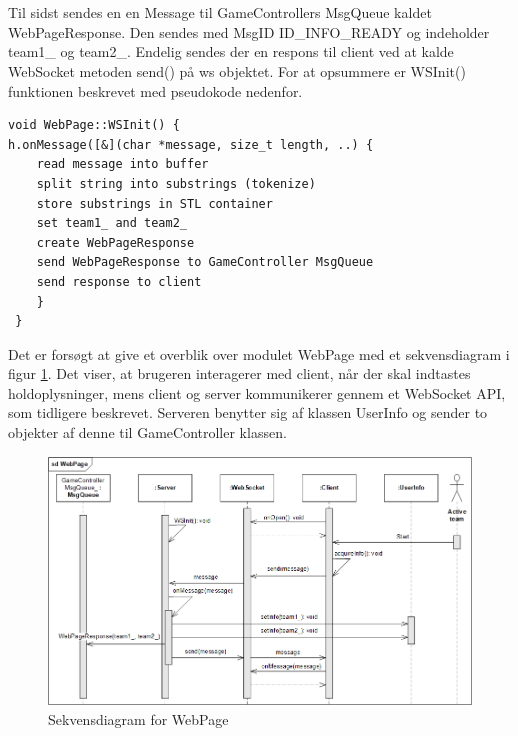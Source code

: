 \documentclass[Softwaredesign/Softwaredesign_main.tex]{subfiles}
\begin{document}
\\\\Til sidst sendes en en Message til GameControllers MsgQueue kaldet WebPageResponse. Den sendes med MsgID ID\_INFO\_READY og indeholder team1\_ og team2\_. Endelig sendes der en respons til client ved at kalde WebSocket metoden send() på ws objektet. For at opsummere er WSInit() funktionen beskrevet med pseudokode nedenfor.

\begin{lstlisting}
void WebPage::WSInit() {
h.onMessage([&](char *message, size_t length, ..) {
    read message into buffer
    split string into substrings (tokenize)
    store substrings in STL container
    set team1_ and team2_
    create WebPageResponse
    send WebPageResponse to GameController MsgQueue
    send response to client
    }
 }
\end{lstlisting}
Det er forsøgt at give et overblik over modulet WebPage med et sekvensdiagram i figur \ref{fig:WebPage_sd}. Det viser, at brugeren interagerer med client, når der skal indtastes holdoplysninger, mens client og server kommunikerer gennem et WebSocket API, som tidligere beskrevet. Serveren benytter sig af klassen UserInfo og sender to objekter af denne til GameController klassen.  
\begin{figure}[H]
    \centering
    \includegraphics[width=1\textwidth]{Softwaredesign/RPiApp/graphic_RPi/WebPage_sd_2.png}
    \caption{Sekvensdiagram for WebPage}
    \label{fig:WebPage_sd}
\end{figure}
\end{document}
